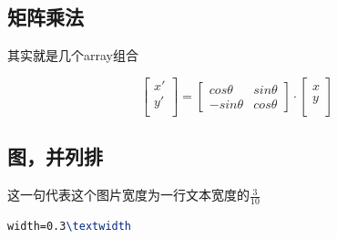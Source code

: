\documentclass[AutoFakeBold]{LZUThesis2007}
\begin{document}

\subsection{矩阵乘法} %
\label{sub:矩阵乘法}

其实就是几个array组合

\begin{equation}
    \left[ 
    \begin{array}{c}
    x'\\
    y'\\
    \end{array}
    \right]=
    \left[ 
    \begin{array}{cc}
    cos \theta & sin \theta \\
    - sin \theta & cos \theta 
    \end{array}
    \right]
    \cdot
    \left[ 
    \begin{array}{c}
        x\\
        y\\
    \end{array}
    \right]
\end{equation}


\subsection{图，并列排} %
\label{sub:图_并列排}

这一句代表这个图片宽度为一行文本宽度的$\frac{3}{10}$
\begin{lstlisting}[language = tex]
width=0.3\textwidth
\end{lstlisting}
\end{document}
